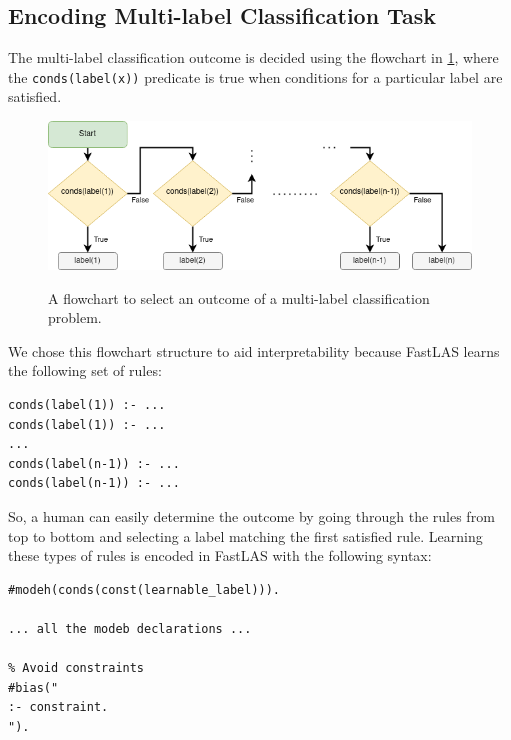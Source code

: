 \subsection{Encoding Multi-label Classification Task}

The multi-label classification outcome is decided using the flowchart in \ref{flowchart-multi-label-classification}, where the \verb_conds(label(x))_ predicate is true when conditions for a particular label are satisfied.

\begin{figure}[h]
\caption{A flowchart to select an outcome of a multi-label classification problem.}
\vspace{10pt}
\centering
\includegraphics[width=\textwidth]{logic-based-classification/multi-label-selection.png}
\label{flowchart-multi-label-classification}
\end{figure}

We chose this flowchart structure to aid interpretability because FastLAS learns the following set of rules:
\begin{verbatim}
conds(label(1)) :- ...
conds(label(1)) :- ...
...
conds(label(n-1)) :- ...
conds(label(n-1)) :- ...
\end{verbatim}
So, a human can easily determine the outcome by going through the rules from top to bottom and selecting a label matching the first satisfied rule.
Learning these types of rules is encoded in FastLAS with the following syntax:
\begin{verbatim}
#modeh(conds(const(learnable_label))).

... all the modeb declarations ...

% Avoid constraints
#bias("
:- constraint.
").
\end{verbatim}

